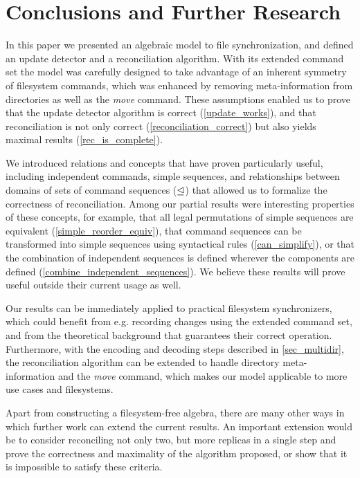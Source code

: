 
\section{Conclusions and Further Research}

In this paper we presented an algebraic model to file synchronization,
and defined an update detector and a reconciliation algorithm.
With its extended command set the model was carefully designed to take
advantage of an inherent symmetry of filesystem commands,
which was enhanced by removing meta-information from directories
as well as the \emph{move} command.
These assumptions enabled us to prove that
the update detector algorithm is correct (\cref{update_works}),
and that reconciliation is not only correct (\cref{reconciliation_correct})
but also yields maximal results (\cref{rec_is_complete}).

We introduced relations and concepts that have proven particularly
useful, including 
independent commands, %
simple sequences, %
and relationships between domains of sets of command sequences ($\trianglelefteq$)
that allowed us to formalize the correctness of reconciliation.
Among our partial results were interesting properties of these concepts,
for example,
that all legal permutations of simple sequences are equivalent (\cref{simple_reorder_equiv}),
that command sequences can be transformed into simple sequences using syntactical rules (\cref{can_simplify}),
or that the combination of independent sequences is defined wherever the components are defined (\cref{combine_independent_sequences}).
We believe these results will prove useful outside their current usage as well.

Our results can be immediately applied to practical filesystem synchronizers,
which could benefit from e.g. recording changes using the extended command set,
and from the theoretical background that guarantees their correct operation.
Furthermore, with the encoding and decoding steps described in \cref{sec_multidir},
the reconciliation algorithm can be extended to handle directory meta-information
and the \emph{move} command,
which makes our model applicable to more use cases and filesystems.

\myskip
Apart from constructing a filesystem-free algebra,
there are many other ways in which further work can extend the current results.
An important extension would be to
consider reconciling not only two, but more replicas in a single step and
prove the correctness and maximality of the algorithm proposed,
or show that it is impossible to satisfy these criteria.

